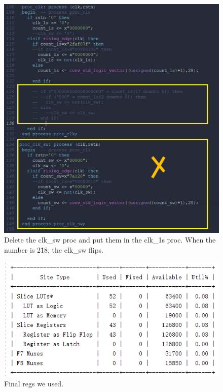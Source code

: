 \documentclass[a4paper]{article}
\begin{document}
\begin{figure}[h]
\centering
\includegraphics[width=1\textwidth]{6.png}
\caption{\label{fig:data}Delete the clk\_sw proc and put them in the clk\_1s proc. When the number is 2\^18, the clk\_sw flips.}
\end{figure}



\begin{figure}[h]
\centering
\includegraphics[width=1\textwidth]{7.png}
\caption{\label{fig:data}Final regs we used.}
\end{figure}
\end{document}

